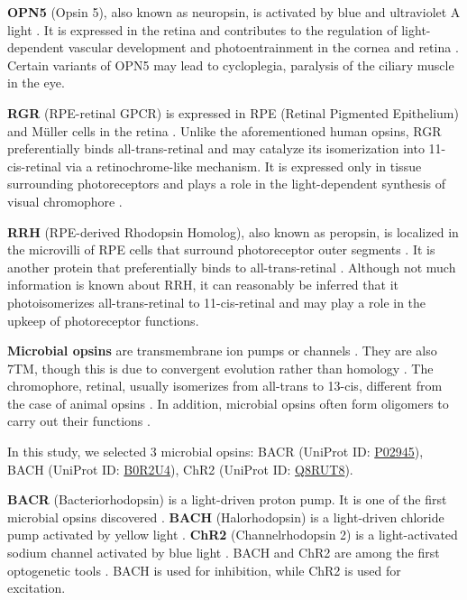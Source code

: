 \documentclass[fleqn, 10pt]{manuscript}
\begin{document}
\textbf{OPN5} (Opsin 5), also known as neuropsin, is activated by blue and ultraviolet A light \citep{Tarttelin_2003}. It is expressed in the retina and contributes to the regulation of light-dependent vascular development and photoentrainment in the cornea and retina \citep{Buhr_2015}. Certain variants of OPN5 may lead to cycloplegia, paralysis of the ciliary muscle in the eye. 

\textbf{RGR} (RPE-retinal GPCR) is expressed in RPE (Retinal Pigmented Epithelium) and M\"uller cells in the retina \citep{Shen_1994}. Unlike the aforementioned human opsins, RGR preferentially binds all-trans-retinal and may catalyze its isomerization into 11-cis-retinal via a retinochrome-like mechanism. It is expressed only in tissue surrounding photoreceptors and plays a role in the light-dependent synthesis of visual chromophore \citep{Radu_2008}.

\textbf{RRH} (RPE-derived Rhodopsin Homolog), also known as peropsin, is localized in the microvilli of RPE cells that surround photoreceptor outer segments \citep{Sun_1997}. It is another protein that preferentially binds to all-trans-retinal \citep{Cook_2017}. Although not much information is known about RRH, it can reasonably be inferred that it photoisomerizes all-trans-retinal to 11-cis-retinal and may play a role in the upkeep of photoreceptor functions. 

\textbf{Microbial opsins} are transmembrane ion pumps or channels \citep{Findlay_1986}. They are also 7TM, though this is due to convergent evolution rather than homology \citep{Yee_2013}. The chromophore, retinal, usually isomerizes from all-trans to 13-cis, different from the case of animal opsins \citep{Findlay_1986}. In addition, microbial opsins often form oligomers to carry out their functions \citep{Gmelin_2007}.

In this study, we selected 3 microbial opsins: BACR (UniProt ID: \href{https://www.uniprot.org/uniprotkb/P02945/entry}{P02945}), BACH (UniProt ID: \href{https://www.uniprot.org/uniprotkb/B0R2U4/entry}{B0R2U4}), ChR2 (UniProt ID: \href{https://www.uniprot.org/uniprotkb/Q8RUT8/entry}{Q8RUT8}). 

\textbf{BACR} (Bacteriorhodopsin) is a light-driven proton pump. It is one of the first microbial opsins discovered \citep{Oesterhelt_1971}. \textbf{BACH} (Halorhodopsin) is a light-driven chloride pump activated by yellow light \citep{Schobert_1982}. \textbf{ChR2} (Channelrhodopsin 2) is a light-activated sodium channel activated by blue light \citep{Nagel_2003}. BACH and ChR2 are among the first optogenetic tools \citep{Zhang_2007, Han_2007}. BACH is used for inhibition, while ChR2 is used for excitation. 
\end{document}
